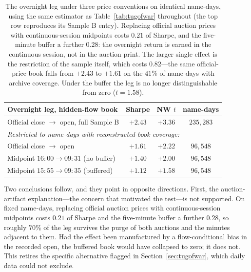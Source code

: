 \documentclass[11pt]{article}
\begin{document}
\begin{table}[htbp]
\centering
\begin{tabular}{lccc}
\toprule
\textbf{Overnight leg, hidden-flow book} & \textbf{Sharpe} & \textbf{NW $t$} & \textbf{name-days} \\
\midrule
Official close $\to$ open, full Sample B & $+2.43$ & $+3.36$ & $235{,}283$ \\
\midrule
\multicolumn{4}{l}{\emph{Restricted to name-days with reconstructed-book coverage:}} \\
\quad Official close $\to$ open & $+1.61$ & $+2.22$ & $96{,}548$ \\
\quad Midpoint $16{:}00 \to 09{:}31$ (no buffer) & $+1.40$ & $+2.00$ & $96{,}548$ \\
\quad Midpoint $15{:}55 \to 09{:}35$ (buffered) & $+1.12$ & $+1.58$ & $96{,}548$ \\
\bottomrule
\end{tabular}
\caption{The overnight leg under three price conventions on identical name-days, using the
same estimator as Table~\ref{tab:tugofwar} throughout (the top row reproduces its Sample B
entry). Replacing official auction prices with continuous-session midpoints costs $0.21$ of
Sharpe, and the five-minute buffer a further $0.28$: the overnight return is earned in the
continuous session, not in the auction print. The larger single effect is the restriction of
the sample itself, which costs $0.82$---the same official-price book falls from $+2.43$ to
$+1.61$ on the $41\%$ of name-days with archive coverage. Under the buffer the leg is no
longer distinguishable from zero ($t=1.58$).}
\label{tab:buffer}
\end{table}

Two conclusions follow, and they point in opposite directions. First, the auction-artifact
explanation---the concern that motivated the test---is not supported. On fixed name-days,
replacing official auction prices with continuous-session midpoints costs $0.21$ of Sharpe
and the five-minute buffer a further $0.28$, so roughly $70\%$ of the leg survives the
purge of both auctions and the minutes adjacent to them. Had the effect been manufactured
by a flow-conditional bias in the recorded open, the buffered book would have collapsed to
zero; it does not. This retires the specific alternative flagged in
Section~\ref{sec:tugofwar}, which daily data could not exclude.
\end{document}
